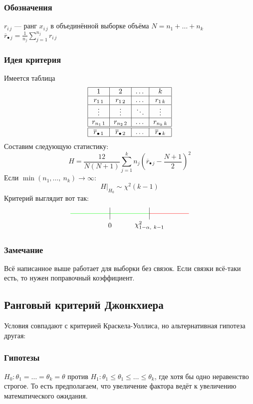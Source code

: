 \documentclass[12pt, a4paper]{article}
\begin{document}
\subsubsection*{Обозначения}
$r_{i\, j}$ --- ранг $x_{i\, j}$ в объединённой выборке объёма $N = n_1 + \dots + n_k$\\
$\overline{r}_{\bullet\, j} = \frac{1}{n_j} \sum_{j = 1}^{n_j} r_{i\, j}$
\subsubsection*{Идея критерия}
Имеется таблица
\[\begin{tabular}{|c|c|c|c|}
    \hline
    1 & 2 & $\dots$ & $k$\\
    \hline
    $r_{1\, 1}$ & $r_{1\, 2}$ & $\dots$ & $r_{1\, k}$\\
    \hline
    $\vdots$ & $\vdots$ & $\ddots$ & $\vdots$\\
    \hline
    $r_{n_1\, 1}$ & $r_{n_2\, 2}$ & $\dots$ & $r_{n_k\, k}$\\
    \hline
    \hline
    $\overline{r}_{\bullet\, 1}$ & $\overline{r}_{\bullet\, 2}$ & $\dots$ & $\overline{r}_{\bullet\, k}$\\
    \hline
\end{tabular}\]
Составим следующую статистику:
\[H = \frac{12}{N(N + 1)} \sum_{j = 1}^{k} n_j {\left( \overline{r}_{\bullet\, j} - \frac{N+1}{2} \right)}^2\]
Если $\min(n_1,\dots,\ n_k) \to \infty$:
\[H\Big|_{H_0} \sim \chi^2(k - 1)\]
Критерий выглядит вот так:
\[\begin{tikzpicture}[scale=2]
    \draw[green] (-1, 0) -- (0, 0);
    \draw[green] (0, 0) -- (1, 0);
    \draw[red] (1, 0) -- (2, 0);
    \draw (0, -0.15) -- ++(0, 0.3);
    \node at (0, -0.3) (a) {$0$};
    \draw (1, -0.15) -- ++(0, 0.3);
    \node at (1, -0.3) (a) {$\chi^2_{1 - \alpha,\ k - 1}$};
\end{tikzpicture}\]
\subsubsection*{Замечание}
Всё написанное выше работает для выборки без связок. Если связки всё-таки есть, то нужен поправочный коэффициент.
\subsection*{Ранговый критерий Джонкхиера}
Условия совпадают с критерией Краскела-Уоллиса, но альтернативная гипотеза другая:
\subsubsection*{Гипотезы}
$H_0: \theta_1 = \dots = \theta_k = \theta$ против $H_1: \theta_1 \leq \theta_1 \leq \dots \leq \theta_k$, где хотя бы одно неравенство строгое. То есть предполагаем, что увеличение фактора ведёт к увеличению математического ожидания.
\end{document}
